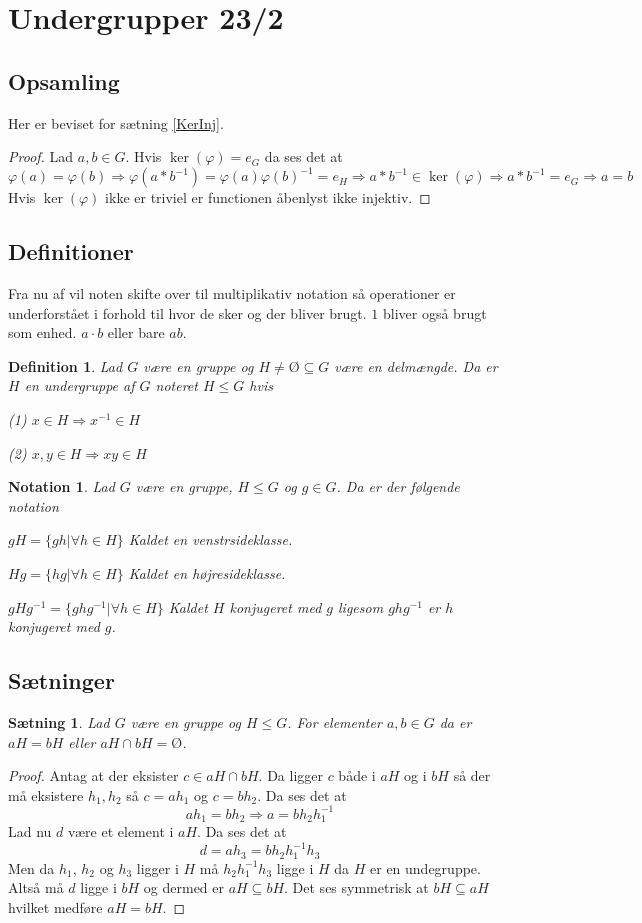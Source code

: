 \documentclass{article}
\newcommand{\inv}{^{-1}}
\newcommand{\imp}{\Rightarrow}
\newtheorem{setn}{Sætning}
\newtheorem{defi}{Definition}
\newtheorem{nota}{Notation}
\begin{document}
	\section*{Undergrupper 23/2}
		\subsection*{Opsamling}
		Her er beviset for sætning \ref{KerInj}.
		\begin{proof}
			Lad $a,b \in G$.
			Hvis $\ker(\varphi) = {e_G}$ da ses det at
			$$\varphi(a) = \varphi(b) \imp \varphi(a*b\inv)=\varphi(a)\varphi(b)\inv=e_H
			\imp a*b\inv \in \ker(\varphi) \imp a*b\inv = e_G \imp a = b$$
			Hvis $\ker(\varphi)$ ikke er triviel er functionen åbenlyst ikke injektiv.
		\end{proof}
		\subsection*{Definitioner}
		Fra nu af vil noten skifte over til multiplikativ notation så operationer
		er underforstået i forhold til hvor de sker og der bliver brugt. $1$ bliver
		også brugt som enhed.
		$a\cdot b$ eller bare $ab$.
		\begin{defi}
			Lad $G$ være en gruppe og $H \ne Ø \subseteq G$ være en delmængde.
			Da er $H$ en undergruppe af $G$ noteret $H \le G$ hvis

			(1) $x \in H \imp x\inv \in H$

			(2) $x,y \in H \imp xy \in H$
		\end{defi}
		\begin{nota}
			Lad $G$ være en gruppe, $H \le G$ og $g \in G$. Da er der følgende notation

			$gH = \{gh | \forall h \in H\}$ Kaldet en venstrsideklasse.

			$Hg = \{hg | \forall h \in H\}$ Kaldet en højresideklasse.

			$gHg\inv = \{ghg\inv | \forall h \in H\}$
			Kaldet $H$ konjugeret med $g$ ligesom $ghg\inv$ er $h$ konjugeret med $g$.
		\end{nota}
		\subsection*{Sætninger}
		\begin{setn} \label{SidKlaPar}
			Lad $G$ være en gruppe og $H \le G$. For elementer $a, b \in G$ da er
			$aH = bH$ eller $aH\cap bH = Ø$.
		\end{setn}
		\begin{proof}
			Antag at der eksister $c \in aH\cap bH$. Da ligger $c$ både i $aH$ og i $bH$ så
			der må eksistere $h_1, h_2$ så $c = ah_1$ og $c = bh_2$. Da ses det at
			$$ah_1 = bh_2 \imp a=bh_2h_1\inv$$
			Lad nu $d$ være et element
			i $aH$. Da ses det at
			$$d = ah_3=bh_2h_1\inv h_3$$
			Men da $h_1$, $h_2$ og $h_3$ ligger i $H$ må $h_2h_1\inv h_3$ ligge i $H$
			da $H$ er en undegruppe. Altså må $d$ ligge i $bH$ og dermed er $aH \subseteq bH$.
			Det ses symmetrisk at $bH \subseteq aH$ hvilket medføre $aH = bH$.
		\end{proof}
\end{document}
